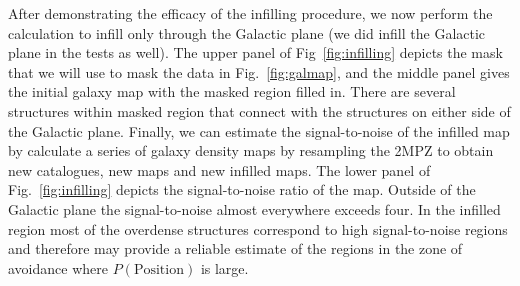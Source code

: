 \documentclass[useAMS,usenatbib]{mn2e}
\begin{document}
After demonstrating the efficacy of the infilling procedure, we now
perform the calculation to infill only through the Galactic plane (we did
infill the Galactic plane in the tests as well).  The upper panel of
Fig~\ref{fig:infilling} depicts the mask that we will use to mask the
data in Fig.~\ref{fig:galmap}, and the middle panel gives the initial
galaxy map with the masked region filled in.  There are several
structures within masked region that connect with the structures on either
side of the Galactic plane.  Finally, we can estimate the
signal-to-noise of the infilled map by calculate a series of galaxy
density maps by resampling the 2MPZ to obtain new catalogues, new maps
and new infilled maps.  The lower panel of Fig.~\ref{fig:infilling}
depicts the signal-to-noise ratio of the map.  Outside of the Galactic
plane the signal-to-noise almost everywhere exceeds four.  In the
infilled region most of the overdense structures correspond to high
signal-to-noise regions and therefore may provide a reliable estimate
of the regions in the zone of avoidance where $P(\mathrm{Position})$
is large.
\end{document}
